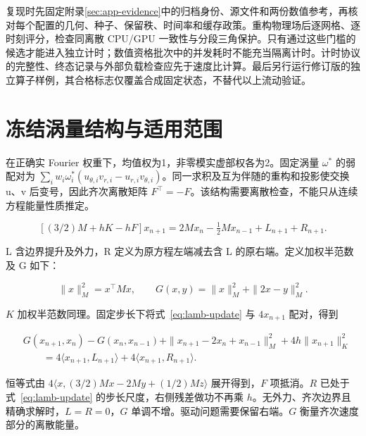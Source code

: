 复现时先固定附录\ref{sec:app-evidence}中的归档身份、源文件和两份数值参考，再核对每个配置的几何、种子、保留秩、时间率和缓存政策。重构物理场后逐网格、逐时刻评分，检查同离散 CPU/GPU 一致性与分段三角保护。只有通过这些门槛的候选才能进入独立计时；数值资格批次中的并发耗时不能充当隔离计时。计时协议的完整性、终态记录与外部负载检查应先于速度比计算。最后另行运行修订版的独立算子样例，其合格标志仅覆盖合成固定状态，不替代以上流动验证。

\section{冻结涡量结构与适用范围}\label{sec:app-lamb}

\setcounter{equation}{0}
\renewcommand{\theequation}{B.\arabic{equation}}
\renewcommand{\theHequation}{appendix.B.\arabic{equation}}

在正确实 Fourier 权重下，均值权为1，非零模实虚部权各为2。固定涡量 \(\omega^*\) 的弱配对为 \(\sum_i w_i\omega_i^*(u_{\theta,i}v_{r,i}-u_{r,i}v_{\theta,i})\)。同一求积及互为伴随的重构和投影使交换 u、v 后变号，因此齐次离散矩阵 \(F^\top=-F\)。该结构需要离散检查，不能只从连续方程能量性质推定。

\begin{equation}
\label{eq:lamb-update}
[(3/2)M+hK-hF]x_{n+1}=2Mx_n-\tfrac12 Mx_{n-1}+L_{n+1}+R_{n+1}.
\end{equation}

L 含边界提升及外力，R 定义为原方程左端减去含 L 的原右端。定义加权半范数及 G 如下：

\begin{equation}
\label{eq:lamb-norm}
\|x\|_M^2=x^\top Mx,\qquad G(x,y)=\|x\|_M^2+\|2x-y\|_M^2.
\end{equation}

\(K\) 加权半范数同理。固定步长下将式~\eqref{eq:lamb-update} 与 \(4x_{n+1}\) 配对，得到

\begin{equation}
\label{eq:lamb-energy}
\begin{aligned}&G(x_{n+1},x_n)-G(x_n,x_{n-1})+\|x_{n+1}-2x_n+x_{n-1}\|_M^2+4h\|x_{n+1}\|_K^2\\&\qquad=4\langle x_{n+1},L_{n+1}\rangle+4\langle x_{n+1},R_{n+1}\rangle.\end{aligned}
\end{equation}

恒等式由 \(4\langle x,(3/2)Mx-2My+(1/2)Mz\rangle\) 展开得到，\(F\) 项抵消。\(R\) 已处于式~\eqref{eq:lamb-update} 的步长尺度，右侧残差做功不再乘 \(h\)。无外力、齐次边界且精确求解时，\(L=R=0\)，\(G\) 单调不增。驱动问题需要保留右端。\(G\) 衡量齐次速度部分的离散能量。

